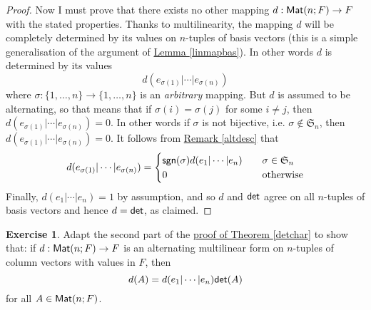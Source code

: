 \documentclass[11pt]{amsbook}
\theoremstyle{definition}
\newtheorem{exercise}{Exercise}
\begin{document}
\begin{proof}
Now I must prove that there exists no other mapping $d: {\sf Mat}(n; F)\to F$ with the stated properties. Thanks to multilinearity, the mapping $d$ will be completely determined by its values on $n$-tuples of basis vectors (this is a simple generalisation of the argument of \hyperref[linmapbas]{Lemma \ref{linmapbas}}). In other words $d$ is determined by its values $$ d( e_{\sigma(1)} | \cdots | e_{\sigma (n)} )$$ where $\sigma : \{ 1, \ldots , n \} \to \{ 1, \ldots , n \}$ is an {\it arbitrary} mapping. But $d$ is assumed to be alternating, so that means that if $\sigma (i) = \sigma (j)$ for some $i\neq j$, then $d( e_{\sigma(1)} | \cdots | e_{\sigma (n)} )= 0$. In other words if $\sigma$ is not bijective, i.e. $\sigma \notin \mathfrak{S}_n$, then $d( e_{\sigma(1)} | \cdots | e_{\sigma (n)} ) = 0$. It follows from \hyperref[altdesc]{Remark \ref{altdesc}} that $$d( e_{\sigma(1)} | \cdots | e_{\sigma (n)} )=  \begin{cases} {\sf sgn}(\sigma) d( e_{1} | \cdots | e_{n} ) \quad & \sigma \in \mathfrak{S}_n \\ 0 & \text{otherwise} \end{cases}$$
Finally, $d( e_{1} | \cdots | e_{n} )=1$ by assumption, and so $d$ and ${\sf det}$ agree on all $n$-tuples of basis vectors and hence $d = {\sf det}$, as claimed.
\end{proof}

\begin{exercise} \label{bestchar}
Adapt the second part of the \hyperref[detchar]{proof of Theorem \ref{detchar}} to show that: if $d: {\sf Mat}(n; F)\to F$ is an alternating multilinear form on $n$-tuples of column vectors with values in $F$, then $$d(A) = d(e_1| \cdots | e_n) {\sf det}(A)$$ for all $A\in {\sf Mat}(n;F)$.
\end{exercise}
\end{document}
